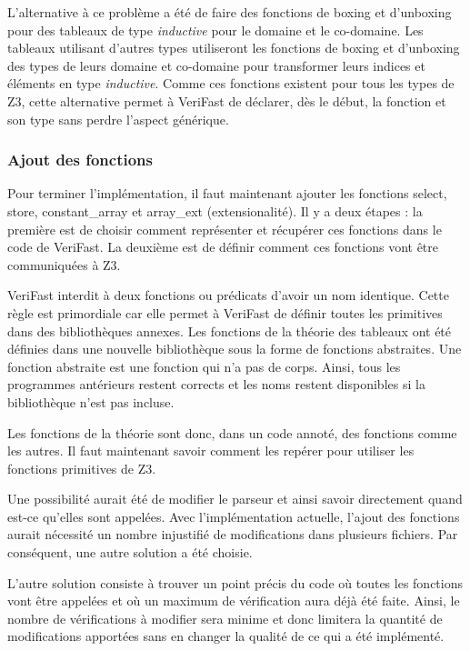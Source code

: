 \documentclass[11pt,openany]{article}
\newcommand{\verifast}{VeriFast}
\begin{document}
			L'alternative \`a ce probl\`eme a \'et\'e de faire des fonctions de boxing et d'unboxing pour des tableaux de type \textit{inductive} pour le domaine et le co-domaine. Les tableaux utilisant d'autres types utiliseront les fonctions de boxing et d'unboxing des types de leurs domaine et co-domaine pour transformer leurs indices et \'el\'ements en type \textit{inductive}. Comme ces fonctions existent pour tous les types de Z3, cette alternative permet \`a \verifast{} de d\'eclarer, d\`es le d\'ebut, la fonction et son type sans perdre l'aspect g\'en\'erique.
			
			
		\subsubsection{Ajout des fonctions}
	Pour terminer l'impl\'ementation, il faut maintenant ajouter les fonctions select, store, constant\_array et array\_ext (extensionalit\'e). Il y a deux \'etapes : la premi\`ere est de choisir comment repr\'esenter  et r\'ecup\'erer ces fonctions dans le code de \verifast{}. La deuxi\`eme est de d\'efinir comment ces fonctions vont \^etre communiqu\'ees \`a Z3.
	
		\verifast{} interdit \`a deux fonctions ou pr\'edicats d'avoir un nom identique. Cette r\`egle est primordiale car elle permet \`a \verifast{} de d\'efinir toutes les primitives dans des biblioth\`eques annexes. Les fonctions de la th\'eorie des tableaux ont \'et\'e d\'efinies dans une nouvelle biblioth\`eque sous la forme de fonctions abstraites. Une fonction abstraite est une fonction qui n'a pas de corps. Ainsi, tous les programmes ant\'erieurs restent corrects et les noms restent disponibles si la biblioth\`eque n'est pas incluse.
		
		Les fonctions de la th\'eorie sont donc, dans un code annot\'e, des fonctions comme les autres. Il faut maintenant savoir comment les rep\'erer pour utiliser les fonctions primitives de Z3.
		
		Une possibilit\'e aurait \'et\'e de modifier le parseur et ainsi savoir directement quand est-ce qu'elles sont appel\'ees. Avec l'impl\'ementation actuelle, l'ajout des fonctions aurait n\'ecessit\'e un nombre injustifi\'e de modifications dans plusieurs fichiers. Par cons\'equent, une autre solution a \'et\'e choisie. 
		
		L'autre solution consiste \`a trouver un point pr\'ecis du code o\`u toutes les fonctions vont \^etre appel\'ees et o\`u un maximum de v\'erification aura d\'ej\`a \'et\'e faite. Ainsi, le nombre de v\'erifications \`a modifier sera minime et donc limitera la quantit\'e de modifications apport\'ees sans en changer la qualit\'e de ce qui a \'et\'e impl\'ement\'e.
		
\end{document}
